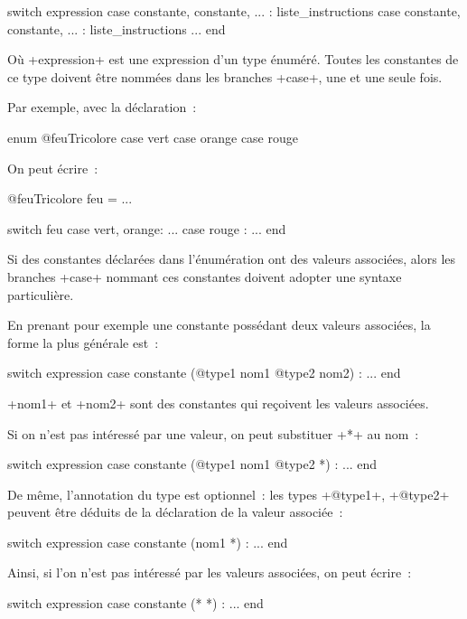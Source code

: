 \begin{galgas3}
switch expression
case constante, constante, ... :
  liste_instructions
case constante, constante, ... :
  liste_instructions
...
end
\end{galgas3}


Où \ggst+expression+ est une expression d'un type énuméré. Toutes les constantes de ce type doivent être nommées dans les branches \ggst+case+, une et une seule fois.

Par exemple, avec la déclaration~:

\begin{galgas3}
enum @feuTricolore {
  case vert
  case orange
  case rouge
}
\end{galgas3}

On peut écrire~:

\begin{galgas3}
@feuTricolore feu = ...

switch feu
case vert, orange:
  ...
case rouge :
  ...
end
\end{galgas3}

Si des constantes déclarées dans l'énumération ont des valeurs associées, alors les branches \ggst+case+ nommant ces constantes doivent adopter une syntaxe particulière.

En prenant pour exemple une constante possédant deux valeurs associées, la forme la plus générale est~:

\begin{galgas3}
switch expression
case constante (@type1 nom1 @type2 nom2) :
...
end
\end{galgas3}

\ggst+nom1+ et \ggst+nom2+ sont des constantes qui reçoivent les valeurs associées.

Si on n'est pas intéressé par une valeur, on peut substituer \ggst+*+ au nom~:

\begin{galgas3}
switch expression
case constante (@type1 nom1 @type2 *) :
...
end
\end{galgas3}

De même, l'annotation du type est optionnel~: les types \ggst+@type1+, \ggst+@type2+ peuvent être déduits de la déclaration de la valeur associée~:

\begin{galgas3}
switch expression
case constante (nom1 *) :
...
end
\end{galgas3}

Ainsi, si l'on n'est pas intéressé par les valeurs associées, on peut écrire~:
\begin{galgas3}
switch expression
case constante (* *) :
...
end
\end{galgas3}


